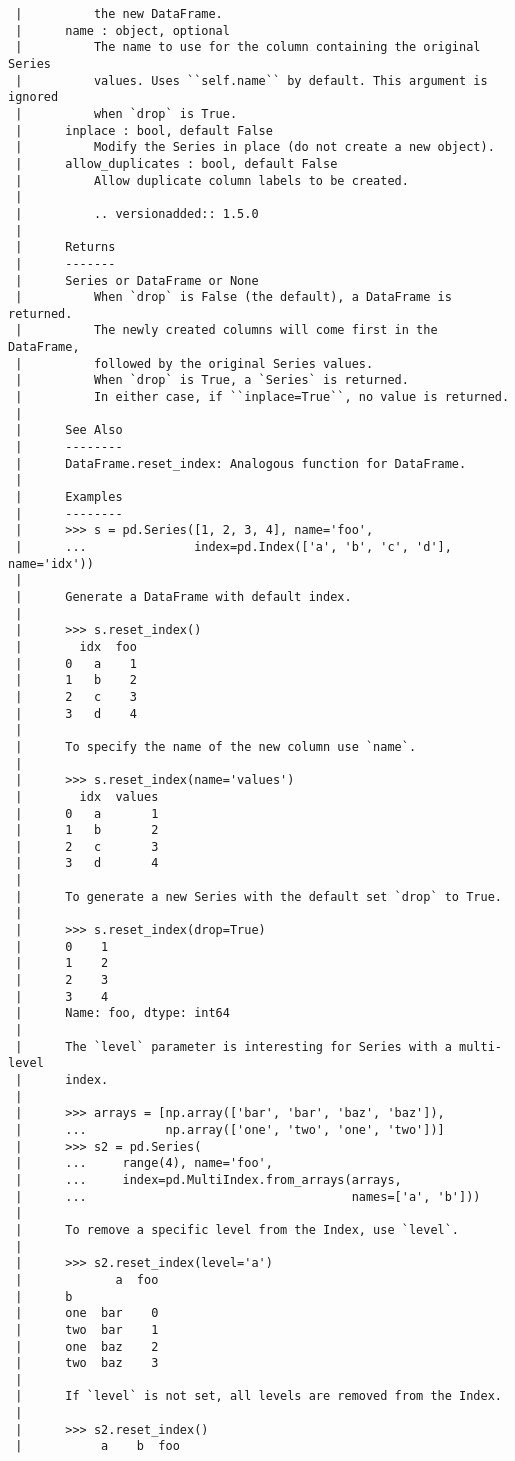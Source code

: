 \documentclass[
  letterpaper,
  DIV=11,
  numbers=noendperiod]{scrreprt}
\begin{document}
\begin{verbatim}
 |          the new DataFrame.
 |      name : object, optional
 |          The name to use for the column containing the original Series
 |          values. Uses ``self.name`` by default. This argument is ignored
 |          when `drop` is True.
 |      inplace : bool, default False
 |          Modify the Series in place (do not create a new object).
 |      allow_duplicates : bool, default False
 |          Allow duplicate column labels to be created.
 |      
 |          .. versionadded:: 1.5.0
 |      
 |      Returns
 |      -------
 |      Series or DataFrame or None
 |          When `drop` is False (the default), a DataFrame is returned.
 |          The newly created columns will come first in the DataFrame,
 |          followed by the original Series values.
 |          When `drop` is True, a `Series` is returned.
 |          In either case, if ``inplace=True``, no value is returned.
 |      
 |      See Also
 |      --------
 |      DataFrame.reset_index: Analogous function for DataFrame.
 |      
 |      Examples
 |      --------
 |      >>> s = pd.Series([1, 2, 3, 4], name='foo',
 |      ...               index=pd.Index(['a', 'b', 'c', 'd'], name='idx'))
 |      
 |      Generate a DataFrame with default index.
 |      
 |      >>> s.reset_index()
 |        idx  foo
 |      0   a    1
 |      1   b    2
 |      2   c    3
 |      3   d    4
 |      
 |      To specify the name of the new column use `name`.
 |      
 |      >>> s.reset_index(name='values')
 |        idx  values
 |      0   a       1
 |      1   b       2
 |      2   c       3
 |      3   d       4
 |      
 |      To generate a new Series with the default set `drop` to True.
 |      
 |      >>> s.reset_index(drop=True)
 |      0    1
 |      1    2
 |      2    3
 |      3    4
 |      Name: foo, dtype: int64
 |      
 |      The `level` parameter is interesting for Series with a multi-level
 |      index.
 |      
 |      >>> arrays = [np.array(['bar', 'bar', 'baz', 'baz']),
 |      ...           np.array(['one', 'two', 'one', 'two'])]
 |      >>> s2 = pd.Series(
 |      ...     range(4), name='foo',
 |      ...     index=pd.MultiIndex.from_arrays(arrays,
 |      ...                                     names=['a', 'b']))
 |      
 |      To remove a specific level from the Index, use `level`.
 |      
 |      >>> s2.reset_index(level='a')
 |             a  foo
 |      b
 |      one  bar    0
 |      two  bar    1
 |      one  baz    2
 |      two  baz    3
 |      
 |      If `level` is not set, all levels are removed from the Index.
 |      
 |      >>> s2.reset_index()
 |           a    b  foo

\end{verbatim}
\end{document}
